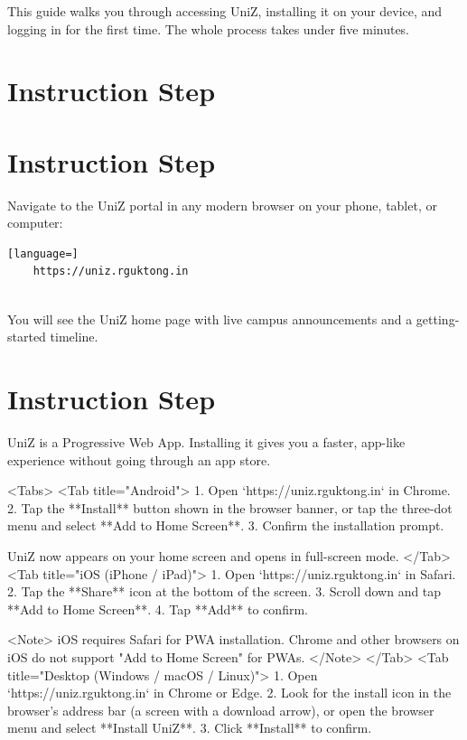 


This guide walks you through accessing UniZ, installing it on your device, and logging in for the first time. The whole process takes under five minutes.


\section{Instruction Step}

  
\section{Instruction Step}

    Navigate to the UniZ portal in any modern browser on your phone, tablet, or computer:

    \begin{lstlisting}[language=]
    https://uniz.rguktong.in
    
\end{lstlisting}

    You will see the UniZ home page with live campus announcements and a getting-started timeline.

  

  
\section{Instruction Step}

    UniZ is a Progressive Web App. Installing it gives you a faster, app-like experience without going through an app store.

    <Tabs>
      <Tab title="Android">
        1. Open `https://uniz.rguktong.in` in Chrome.
        2. Tap the **Install** button shown in the browser banner, or tap the three-dot menu and select **Add to Home Screen**.
        3. Confirm the installation prompt.

        UniZ now appears on your home screen and opens in full-screen mode.
      </Tab>
      <Tab title="iOS (iPhone / iPad)">
        1. Open `https://uniz.rguktong.in` in Safari.
        2. Tap the **Share** icon at the bottom of the screen.
        3. Scroll down and tap **Add to Home Screen**.
        4. Tap **Add** to confirm.

        <Note>
          iOS requires Safari for PWA installation. Chrome and other browsers on iOS do not support "Add to Home Screen" for PWAs.
        </Note>
      </Tab>
      <Tab title="Desktop (Windows / macOS / Linux)">
        1. Open `https://uniz.rguktong.in` in Chrome or Edge.
        2. Look for the install icon in the browser's address bar (a screen with a download arrow), or open the browser menu and select **Install UniZ**.
        3. Click **Install** to confirm.

